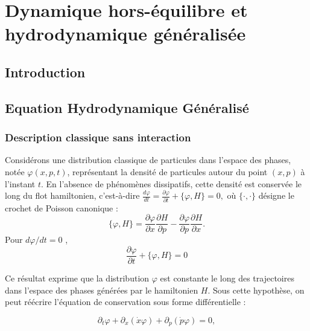 \chapter{Dynamique hors-équilibre et hydrodynamique généralisée}
\label{chap:GHD}
\minitoc


\section*{Introduction}

\section{Equation Hydrodynamique Généralisé}

\subsection{Description classique sans interaction}
Considérons une distribution classique de particules dans l’espace des phases, notée $\varphi(x, p, t)$, représentant la densité de particules autour du point $(x, p)$ à l’instant $t$. En l’absence de phénomènes dissipatifs, cette densité est conservée le long du flot hamiltonien, c’est-à-dire \(
\frac{d\varphi}{dt} = \frac{\partial \varphi}{\partial t} + \{ \varphi , H \} = 0,
\)
où $\{ \cdot , \cdot \}$ désigne le crochet de Poisson canonique :
\begin{equation}
\{ \varphi , H \} = \frac{\partial \varphi}{\partial x} \frac{\partial H}{\partial p} - \frac{\partial \varphi}{\partial p} \frac{\partial H}{\partial x}.
\end{equation}
Pour $d \varphi /dt = 0 $ , 
\begin{equation}
	\frac{\partial \varphi}{\partial t} + \{ \varphi , H \} = 0	
\end{equation}


Ce résultat exprime que la distribution $\varphi$ est constante le long des trajectoires dans l’espace des phases générées par le hamiltonien $H$. Sous cette hypothèse, on peut réécrire l’équation de conservation sous forme différentielle :

\begin{equation}
\partial_t \varphi + \partial_x ( \dot{x} \varphi ) + \partial_p ( \dot{p} \varphi ) = 0,
\end{equation}

